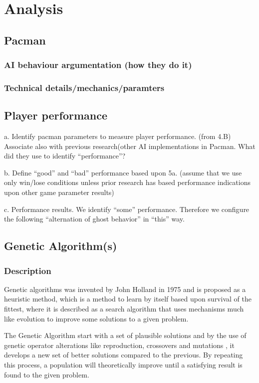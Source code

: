 \section{Analysis} \label{sec:analysis}




\subsection{Pacman}
\subsubsection{AI behaviour argumentation (how they do it)}
\subsubsection{Technical details/mechanics/paramters}

\subsection{Player performance}
a. Identify pacman parameters to measure player performance. (from 4.B) Associate also with  previous research(other AI implementations in Pacman. What did they use to  identify “performance”?


b. Define “good” and “bad” performance based upon 5a. (assume that we use only win/lose conditions unless prior research has based performance indications upon other game parameter results)

c. Performance results. We identify “some” performance. Therefore we configure the following “alternation of ghost behavior” in “this” way.

\subsection{Genetic Algorithm(s)}

\subsubsection{Description}
Genetic algorithms was invented by John Holland in 1975 and is proposed as a heuristic method, which is a method to learn by itself based upon survival of the fittest, where it is described as a  search algorithm that uses mechanisms much like evolution to improve some solutions to a given problem. \cite[pp. 20]{Sivanandam2008}

The Genetic Algorithm start with a set of plausible solutions and by the use of genetic operator alterations like reproduction, crossovers and mutations \cite{Baltzer2014}, it develops a new set of better solutions compared to the previous. By repeating this process, a population will theoretically improve until a satisfying result is found to the given problem. \cite{BCS2013}


